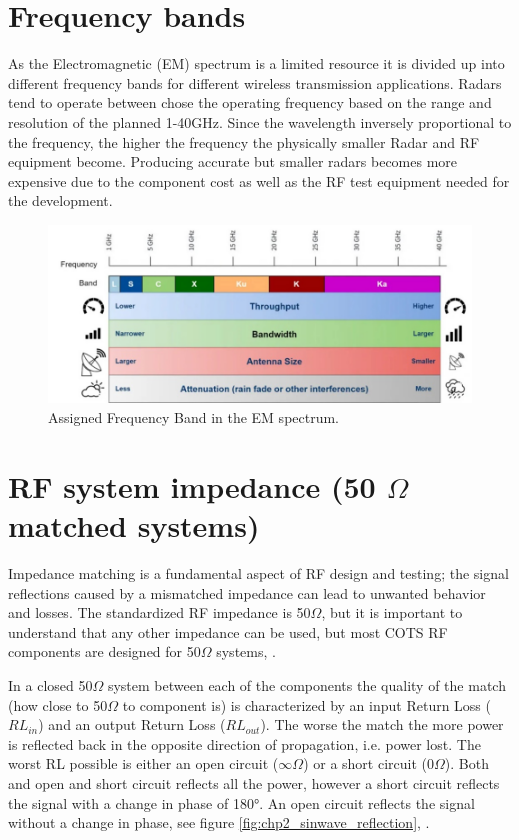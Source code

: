 \section{Frequency bands}
As the Electromagnetic (EM) spectrum is a limited resource it is divided up into different frequency bands for different wireless transmission applications. Radars tend to operate between  chose the operating frequency based on the range and resolution of the planned 1-40GHz. Since the wavelength inversely proportional to the frequency, the higher the frequency the physically smaller Radar and RF equipment become. Producing accurate but smaller radars becomes more expensive due to the component cost as well as the RF test equipment needed for the development.

    \begin{figure}[H]
    \centering
    \includegraphics[width=0.8\linewidth]{Figures/chp2_EM_spectrum.png}
    \caption{Assigned Frequency Band in the EM spectrum.}
    \label{fig:chp2_EM_spectrum}
    \end{figure}
    
\section{\texorpdfstring{RF system impedance (50 $\Omega$ matched systems)}{The Omega Symbol}}\label{sec:OCSO50}
Impedance matching is a fundamental aspect of RF design and testing; the signal reflections caused by a mismatched impedance can lead to unwanted behavior and losses. The standardized RF impedance is 50$\Omega$, but it is important to understand that any other impedance can be used, but most COTS RF components are designed for 50$\Omega$ systems, \cite{50Ohm}.

In a closed 50$\Omega$ system between each of the components the quality of the match (how close to 50$\Omega$ to component is) is characterized by an input Return Loss ($RL_{in}$) and an output Return Loss ($RL_{out}$). The worse the match the more power is reflected back in the opposite direction of propagation, i.e. power lost. The worst RL possible is either an open circuit ($\infty$$\Omega$) or a short circuit (0$\Omega$). Both and open and short circuit reflects all the power, however a short circuit reflects the signal with a change in phase of 180°. An open circuit reflects the signal without a change in phase, see figure \ref{fig:chp2_sinwave_reflection}, \cite{VSWR}.


